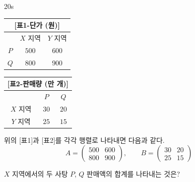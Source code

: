 \documentclass[10pt]{article}
\begin{document}
\begin{pagepair}
\begin{minipage}[t][210mm][t]{0.46\linewidth}
\begin{problem}{20}{s}
\begin{center}
\small
\begin{tabular}{c|cc}
\multicolumn{3}{c}{[표1-단가 (원)]} \\ \hline
      & $X$ 지역 & $Y$ 지역 \\ \hline
$P$   & $500$ & $600$ \\
$Q$   & $800$ & $900$
\end{tabular}
\quad
\begin{tabular}{c|cc}
\multicolumn{3}{c}{[표2-판매량 (만 개)]} \\ \hline
        & $P$    & $Q$    \\ \hline
$X$ 지역 & $30$  & $20$  \\
$Y$ 지역 & $25$  & $15$
\end{tabular}
\end{center}

위의 [표1]과 [표2]를 각각 행렬로 나타내면 다음과 같다.
\[ A = \begin{pmatrix} 500 & 600 \\ 800 & 900 \end{pmatrix}, \qquad B = \begin{pmatrix} 30 & 20 \\ 25 & 15 \end{pmatrix} \]

$X$ 지역에서의 두 사탕 $P$, $Q$ 판매액의 합계를 나타내는 것은?
\begin{choices}
\end{choices}
\end{problem}
\end{minipage}
\end{pagepair}
\end{document}
